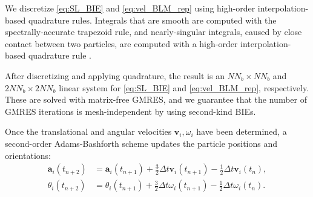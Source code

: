 \documentclass[prb,preprint,showpacs,preprintnumbers,amsmath,amssymb,longbibliography]{revtex4-1}
\renewcommand{\aa}{\mathbf{a}}
\renewcommand{\vv}{\mathbf{v}}
\begin{document}
We discretize \eqref{eq:SL_BIE} and \eqref{eq:vel_BLM_rep}
using high-order interpolation-based quadrature rules.
Integrals that are smooth are computed with
the spectrally-accurate trapezoid rule, and nearly-singular integrals,
caused by close contact between two particles, are computed with a
high-order interpolation-based quadrature rule \cite{qua-bir2014}.

After discretizing and applying quadrature,
the result is an $NN_b \times NN_b$ and $2NN_b \times 2NN_b$
linear system for \eqref{eq:SL_BIE} and \eqref{eq:vel_BLM_rep}, respectively.
These are solved with matrix-free GMRES, and we guarantee that the number of
GMRES iterations is mesh-independent by using second-kind BIEs.

Once the translational and angular velocities $\vv_i, \omega_i$
have been determined, a second-order Adams-Bashforth scheme updates the particle
positions and orientations:
\begin{equation}
  \label{eq:adams-bashforth}
  \begin{aligned}
    \aa_i(t_{n+2}) &=
\aa_i(t_{n+1})
+ \tfrac{3}{2}\Delta t \vv_i(t_{n+1})
- \tfrac{1}{2}\Delta t \vv_i(t_{n}),\\
    \theta_i(t_{n+2}) &=
\theta_i(t_{n+1})
+ \tfrac{3}{2}\Delta t \omega_i(t_{n+1})
- \tfrac{1}{2}\Delta t \omega_i(t_{n}).
  \end{aligned}
\end{equation}
\end{document}
